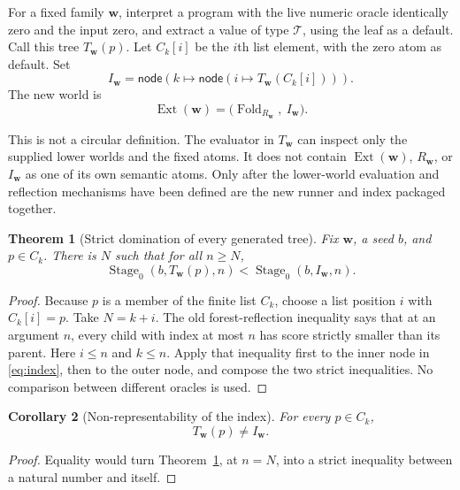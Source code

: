 \documentclass[11pt]{article}
\newtheorem{theorem}{Theorem}[section]
\newtheorem{corollary}[theorem]{Corollary}
\theoremstyle{definition}
\theoremstyle{remark}
\newcommand{\Tree}{\mathcal T}
\newcommand{\Ext}{\operatorname{Ext}}
\newcommand{\OldStage}{\operatorname{Stage}_0}
\newcommand{\ctx}{\boldsymbol w}
\begin{document}
For a fixed family $\ctx$, interpret a program with the live numeric oracle
identically zero and the input zero, and extract a value of type $\Tree$,
using the leaf as a default. Call this tree $T_{\ctx}(p)$. Let $C_k[i]$ be the
$i$th list element, with the zero atom as default. Set
\begin{equation}\label{eq:index}
 I_{\ctx}=\mathsf{node}\left(k\mapsto
        \mathsf{node}\left(i\mapsto T_{\ctx}(C_k[i])\right)\right).
\end{equation}
The new world is
\begin{equation}\label{eq:extend}
 \Ext(\ctx)=
 \bigl(\operatorname{Fold}_{R_{\ctx}},\ I_{\ctx}\bigr).
\end{equation}

This is not a circular definition. The evaluator in $T_{\ctx}$ can inspect
only the supplied lower worlds and the fixed atoms. It does not contain
$\Ext(\ctx)$, $R_{\ctx}$, or $I_{\ctx}$ as one of its own semantic atoms.
Only after the lower-world evaluation and reflection mechanisms have been
defined are the new runner and index packaged together.

\begin{theorem}[Strict domination of every generated tree]\label{thm:tree}
Fix $\ctx$, a seed $b$, and $p\in C_k$. There is $N$ such that for all $n\ge N$,
\[
 \OldStage(b,T_{\ctx}(p),n)<\OldStage(b,I_{\ctx},n).
\]
\end{theorem}
\begin{proof}
Because $p$ is a member of the finite list $C_k$, choose a list position $i$
with $C_k[i]=p$. Take $N=k+i$. The old forest-reflection inequality says that
at an argument $n$, every child with index at most $n$ has score strictly
smaller than its parent. Here $i\le n$ and $k\le n$. Apply that inequality
first to the inner node in \eqref{eq:index}, then to the outer node, and
compose the two strict inequalities. No comparison between different
oracles is used.
\end{proof}

\begin{corollary}[Non-representability of the index]\label{cor:tree-diagonal}
For every $p\in C_k$,
\[
                         T_{\ctx}(p)\ne I_{\ctx}.
\]
\end{corollary}
\begin{proof}
Equality would turn Theorem~\ref{thm:tree}, at $n=N$, into a strict
inequality between a natural number and itself.
\end{proof}
\end{document}
